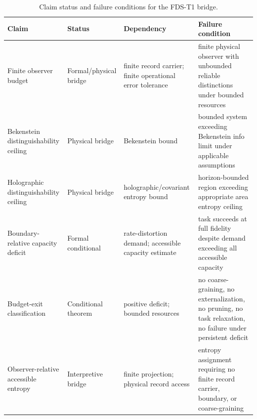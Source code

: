 \documentclass[10pt,a4paper,twocolumn,aps,prl]{revtex4-2}
\begin{document}
\begin{table}[t!]
\centering
\small
\setlength{\tabcolsep}{4pt}
\renewcommand{\arraystretch}{1.25}
\begin{tabular}{llll}
\toprule
\parbox[t]{2.5cm}{\raggedright\textbf{Claim}} &
\parbox[t]{2.2cm}{\raggedright\textbf{Status}} &
\parbox[t]{4.4cm}{\raggedright\textbf{Dependency}} &
\parbox[t]{4.8cm}{\raggedright\textbf{Failure condition}}\\
\midrule
\parbox[t]{2.5cm}{\raggedright Finite observer budget} &
\parbox[t]{2.4cm}{\raggedright Formal/physical bridge} &
\parbox[t]{4.4cm}{\raggedright finite record carrier; finite operational error tolerance} &
\parbox[t]{4.8cm}{\raggedright finite physical observer with unbounded reliable distinctions under bounded resources}\\[0.6em]
\parbox[t]{2.5cm}{\raggedright Bekenstein distinguishability ceiling} &
\parbox[t]{2.2cm}{\raggedright Physical bridge} &
\parbox[t]{4.4cm}{\raggedright Bekenstein bound} &
\parbox[t]{4.8cm}{\raggedright bounded system exceeding Bekenstein info limit under applicable assumptions}\\[0.6em]
\parbox[t]{2.5cm}{\raggedright Holographic distinguishability ceiling} &
\parbox[t]{2.2cm}{\raggedright Physical bridge} &
\parbox[t]{4.4cm}{\raggedright holographic/covariant entropy bound} &
\parbox[t]{4.8cm}{\raggedright horizon-bounded region exceeding appropriate area entropy ceiling}\\[0.6em]
\parbox[t]{2.5cm}{\raggedright Boundary-relative capacity deficit} &
\parbox[t]{2.2cm}{\raggedright Formal conditional} &
\parbox[t]{4.4cm}{\raggedright rate-distortion demand; accessible capacity estimate} &
\parbox[t]{4.8cm}{\raggedright task succeeds at full fidelity despite demand exceeding all accessible capacity}\\[0.6em]
\parbox[t]{2.5cm}{\raggedright Budget-exit classification} &
\parbox[t]{2.2cm}{\raggedright Conditional theorem} &
\parbox[t]{4.4cm}{\raggedright positive deficit; bounded resources} &
\parbox[t]{4.8cm}{\raggedright no coarse-graining, no externalization, no pruning, no task relaxation, no failure under persistent deficit}\\[0.6em]
\parbox[t]{2.5cm}{\raggedright Observer-relative accessible entropy} &
\parbox[t]{2.2cm}{\raggedright Interpretive bridge} &
\parbox[t]{4.4cm}{\raggedright finite projection; physical record access} &
\parbox[t]{4.8cm}{\raggedright entropy assignment requiring no finite record carrier, boundary, or coarse-graining}\\
\bottomrule
\end{tabular}
\caption{Claim status and failure conditions for the FDS-T1 bridge.}
\end{table}
\end{document}
